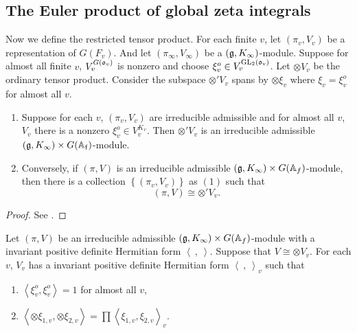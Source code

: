 \subsection{The Euler product of global zeta integrals}

Now we define the restricted tensor product. For each finite $v$, let $(\pi_v,V_v)$ be a representation of $G(F_v)$. And let $(\pi_\infty,V_\infty)$ be a $(\mathfrak g, K_\infty)$-module. Suppose for almost all finite $v$, $V_v^{G(\mathfrak o_v)}$ is nonzero and choose $\xi_v^o\in V_v^{\mathrm {GL_2(\mathfrak o_v)}}$. Let $\otimes V_v$ be the ordinary tensor product. Consider the subspace $\otimes' V_v$ spans by $\otimes \xi_v$ where $\xi_v=\xi_v^o$ for almost all $v$.

\begin{theorem} \hfill
\begin{enumerate}
  \item Suppose for each $v$, $(\pi_v,V_v)$ are irreducible admissible and for almost all $v$, $V_v$ there is a nonzero $\xi_v^o \in  V_v^{K_v}$. Then $\otimes' V_v$ is an irreducible admissible $(\mathfrak g,K_\infty)\times G(\mathbb A_{\mathrm f})$-module.\\
  \item Conversely, if $(\pi,V)$ is an irreducible admissible $(\mathfrak g,K_\infty)\times G(\mathbb A_f)$-module, then there is a collection $\left \{ (\pi_v,V_v)\right \}$ as $(1)$ such that
\[ (\pi, V)\cong \otimes ' V_v. \]
\end{enumerate}
\end{theorem}

\begin{proof}
See .
\end{proof}


\begin{proposition}
Let $(\pi,V)$ be an irreducible admissible $(\mathfrak g,K_\infty)\times G(\mathbb A_f)$-module with a invariant positive definite Hermitian form $\left \langle \ , \ \right \rangle$. Suppose that $V\cong\otimes V_v$. For each $v$, $V_v$ has a invariant positive definite Hermitian form $\left \langle \ ,\ \right \rangle_v$ such that
\begin{enumerate}
\item  $\left \langle \xi_v^o,\xi_v^o\right \rangle=1$ for almost all $v$,
\item $\left \langle \otimes \xi_{1,v}, \otimes \xi_{2,v} \right \rangle =\prod \left \langle \xi_{1,v}, \xi_{2,v} \right \rangle_v$.
\end{enumerate}
\end{proposition}

